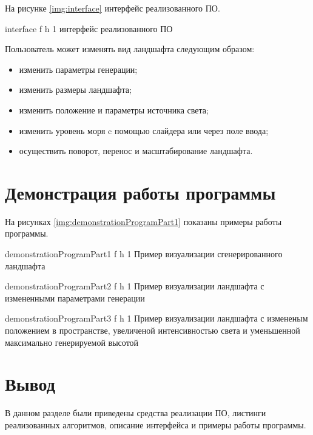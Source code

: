 На рисунке \ref{img:interface} интерфейс реализованного ПО.

{interface} %
{f} %
{h} %
{1\textwidth} %
{интерфейс реализованного ПО} %

Пользователь может изменять вид ландшафта следующим образом:
\begin{itemize}[label*=--]
	 \item изменить параметры генерации;
	 \item изменить размеры ландшафта;
	 \item изменить положение и параметры источника света;
	 \item изменить уровень моря c помощью слайдера или через поле ввода;
	 \item осуществить поворот, перенос и масштабирование ландшафта.
\end{itemize}

\clearpage

\section{Демонстрация работы программы}

На рисунках \ref{img:demonstrationProgramPart1} показаны примеры работы программы.

{demonstrationProgramPart1} %
{f} %
{h} %
{1\textwidth} %
{Пример визуализации сгенерированного ландшафта} %

\clearpage

{demonstrationProgramPart2} %
{f} %
{h} %
{1\textwidth} %
{Пример визуализации ландшафта с измененными параметрами генерации} %

\clearpage

{demonstrationProgramPart3} %
{f} %
{h} %
{1\textwidth} %
{Пример визуализации ландшафта с измененым положением в пространстве, увеличеной интенсивностью света и уменьшенной максимально генерируемой высотой} %

\section*{Вывод}

В данном разделе были приведены средства реализации ПО, листинги реализованных алгоритмов, описание интерфейса и примеры работы программы.
